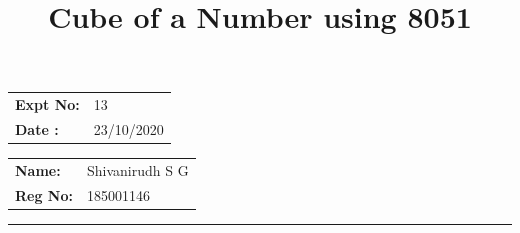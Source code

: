 \documentclass[12pt,a4paper]{article}
\title{\bf Cube of a Number using 8051}
\author{\vspace{-10ex}}
\date{\vspace{-10ex}}
\begin{document}
\maketitle

\begin{minipage}{0.45\textwidth}
        \begin{tabular}{l l}
            \textbf{Expt No:}&13\\
            \textbf{Date :}&23/10/2020
        \end{tabular}
\end{minipage}%
\begin{minipage}{0.45\textwidth}
        \begin{tabular}{l l}
             \textbf{Name:}& Shivanirudh S G  \\
             \textbf{Reg No:} & 185001146 
        \end{tabular}
\end{minipage}
\vspace{1cm}
\hrule
\end{document}
